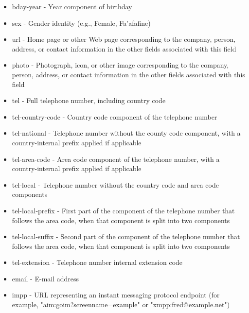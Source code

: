 \begin{itemize}
\item bday-year - Year component of birthday
\item sex - Gender identity (e.g., Female, Fa’afafine)
\item url - Home page or other Web page corresponding to the company, person, address, or contact information in the other fields associated with this field
\item photo - Photograph, icon, or other image corresponding to the company, person, address, or contact information in the other fields associated with this field
\item tel - Full telephone number, including country code
\item tel-country-code - Country code component of the telephone number
\item tel-national - Telephone number without the county code component, with a country-internal prefix applied if applicable
\item tel-area-code - Area code component of the telephone number, with a country-internal prefix applied if applicable
\item tel-local - Telephone number without the country code and area code components
\item tel-local-prefix - First part of the component of the telephone number that follows the area code, when that component is split into two components
\item tel-local-suffix - Second part of the component of the telephone number that follows the area code, when that component is split into two components
\item tel-extension - Telephone number internal extension code
\item email - E-mail address
\item impp - URL representing an instant messaging protocol endpoint (for example, "aim:goim?screenname=example" or "xmpp:fred@example.net")
\end{itemize}